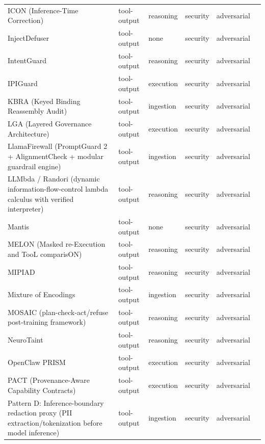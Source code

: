 \begin{longtable}{@{}>{\raggedright\arraybackslash}p{}lllll@{}}
ICON (Inference-Time Correction) & tool-output & reasoning & security & adversarial & \cite{wang-2026-icon} \\
InjectDefuser & tool-output & none & security & adversarial & \cite{koide-2026-clouding} \\
IntentGuard & tool-output & reasoning & security & adversarial & \cite{kang-2025-mitigating} \\
IPIGuard & tool-output & execution & security & adversarial & \cite{an-2025-ipiguard} \\
KBRA (Keyed Binding Reassembly Audit) & tool-output & ingestion & security & adversarial & \cite{liu-2026-safe} \\
LGA (Layered Governance Architecture) & tool-output & execution & security & adversarial & \cite{ge-2026-governance} \\
LlamaFirewall (PromptGuard 2 + AlignmentCheck + modular guardrail engine) & tool-output & ingestion & security & adversarial & \cite{chennabasappa-2025-llamafirewall} \\
LLMbda / Randori (dynamic information-flow-control lambda calculus with verified interpreter) & tool-output & reasoning & security & adversarial & \cite{garby-2026-llmbda} \\
Mantis & tool-output & none & security & adversarial & \cite{pasquini-2024-hacking} \\
MELON (Masked re-Execution and TooL comparisON) & tool-output & reasoning & security & adversarial & \cite{zhu-2025-melon} \\
MIPIAD & tool-output & reasoning & security & adversarial & \cite{muhtadi-2026-mipiad} \\
Mixture of Encodings & tool-output & ingestion & security & adversarial & \cite{zhang-2025-defense} \\
MOSAIC (plan-check-act/refuse post-training framework) & tool-output & reasoning & security & adversarial & \cite{agarwal-2026-learning} \\
NeuroTaint & tool-output & reasoning & security & adversarial & \cite{cai-2026-ghost} \\
OpenClaw PRISM & tool-output & execution & security & adversarial & \cite{li-2026-openclaw} \\
PACT (Provenance-Aware Capability Contracts) & tool-output & execution & security & adversarial & \cite{fan-2026-granularity} \\
Pattern D: Inference-boundary redaction proxy (PII extraction/tokenization before model inference) & tool-output & ingestion & security & adversarial & \cite{mohan-2026-agent} \\

\end{longtable}
